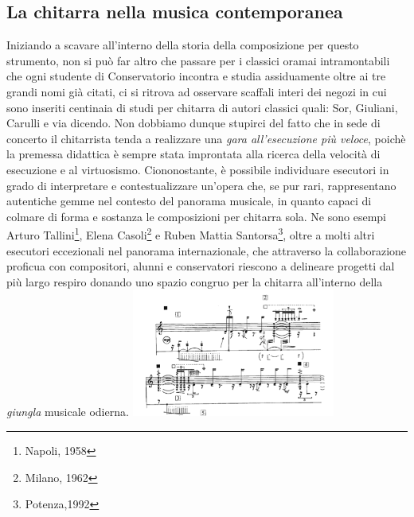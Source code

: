 \documentclass[oneside]{article}
\begin{document}
\begin{multicols*}{2}

\section{ La chitarra nella musica contemporanea}
\noindent

Iniziando a scavare all'interno della storia della composizione per questo strumento, non si può far altro che passare per i classici oramai intramontabili che ogni studente di Conservatorio incontra e studia assiduamente oltre ai tre grandi nomi già citati, ci si ritrova ad osservare scaffali interi dei negozi in cui sono inseriti centinaia di studi per chitarra di autori classici quali: Sor, Giuliani, Carulli e via dicendo. Non dobbiamo dunque stupirci del fatto che in sede di concerto il chitarrista tenda a realizzare una \textit{gara all'esecuzione più veloce}, poichè la premessa didattica è sempre stata improntata alla ricerca della velocità di esecuzione e al virtuosismo. Ciononostante, è 
possibile individuare esecutori in grado di interpretare e contestualizzare un'opera che, se pur rari, rappresentano autentiche gemme nel contesto del panorama musicale, in quanto capaci di colmare di forma e sostanza le composizioni per chitarra sola. Ne sono esempi Arturo Tallini\footnote{Napoli, 1958},  Elena Casoli\footnote{Milano, 1962} e Ruben Mattia Santorsa\footnote{Potenza,1992}, oltre a molti altri esecutori eccezionali nel panorama internazionale, che attraverso la collaborazione proficua con compositori, alunni e conservatori riescono a delineare progetti dal più largo respiro donando uno spazio congruo per la chitarra all'interno della \textit{giungla} musicale odierna.
\includegraphics[width=0.5\textwidth]{img/ektopos.png}

\end{multicols*}
\end{document}

